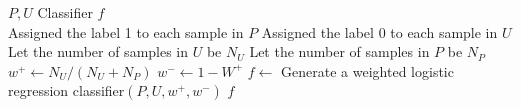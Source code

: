 \documentclass{article}
\begin{document}
\begin{algorithm}[!h]
\renewcommand{\algorithmicrequire}{\textbf{Input:}} %
\renewcommand{\algorithmicensure}{\textbf{Output:}} %
	\caption{Weighted\_LR} %
	\begin{algorithmic}[1] %
	    \REQUIRE
	    $P,U$
	    \ENSURE
	    Classifier $f$ \\
		\STATE Assigned the label 1 to each sample in $P$
		\STATE Assigned the label 0 to each sample in $U$
		\STATE Let the number of samples in $U$ be $N_U$
		\STATE Let the number of samples in $P$ be $N_P$
		\STATE $w^+\leftarrow N_U/(N_U+N_P)$
		\STATE $w^-\leftarrow 1-W^+$
		\STATE $f\leftarrow$ Generate a weighted logistic regression classifier$(P,U,w^+,w^-)$
		\RETURN $f$
	\end{algorithmic}
\end{algorithm}
\end{document}

